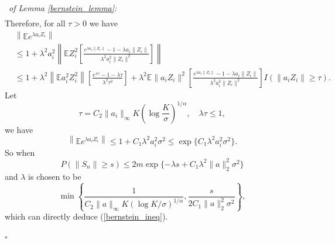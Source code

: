 \documentclass[12pt]{article}
\newenvironment{pf}{{\noindent\it Proof}\ }{\hfill $\square$\par}
\begin{document}
\begin{pf}{\it of Lemma \ref{bernstein_lemma}:}
\begin{align*}
  \end{align*}
  Therefore, for all $\tau >0$ we have
  \begin{align*}
  &\left\| \mathbb{E} e^{\lambda a_i Z_i}\right\|\\&\le 1 + \lambda^{2}a_i^2 \left\|\mathbb{E} Z_i^{2}\left[\frac{e^{\lambda a_i\|Z_i\|}-1-\lambda a_i\|Z_i\|}{\lambda^{2}a_i^2\|Z_i\|^{2}}\right]\right\| 
  \\& \le
  1 + \lambda^{2} \left\|\mathbb{E} a_i^2 Z_i^{2}\right\|\left[\frac{e^{\lambda \tau}-1-\lambda \tau}{\lambda^2\tau^2}\right] + \lambda^2 \mathbb{E}\|a_iZ_i\|^2\left[\frac{e^{\lambda a_i\|Z_i\|}-1-\lambda a_i\|Z_i\|}{\lambda^{2}a_i^2\|Z_i\|^{2}}\right]I(\|a_iZ_i\|\ge \tau).
  \end{align*}
  Let $$\tau = C_2 \|a_i\|_\infty K (\log \frac{K}{\sigma})^{1/\alpha}, \quad \lambda\tau \le 1,$$
  we have 
  \begin{equation*}
  \left\|\mathbb{E} e^{\lambda a_i Z_i} \right\|\le 1 + C_1 \lambda^2 a_i^2 \sigma^2 \le \exp\{C_1\lambda^2 a_i^2 \sigma^2\}.
  \end{equation*}
  So when
  \begin{equation*}
  P(\|S_n\|\ge s) \le 2m \exp\{-\lambda s + C_1\lambda^2 \|a\|_2^2 \sigma^2\}
  \end{equation*}
  and $\lambda$ is chosen to be $$\min\left\{\frac{1}{C_2\|a\|_{\infty}K\left(\log K/\sigma \right)^{1/\alpha}}, \frac{s}{2C_1 \|a\|_2^2 \sigma^2}\right\},$$
  which can directly deduce (\ref{bernstein_ineq}).
  
\end{pf}
\end{document}
